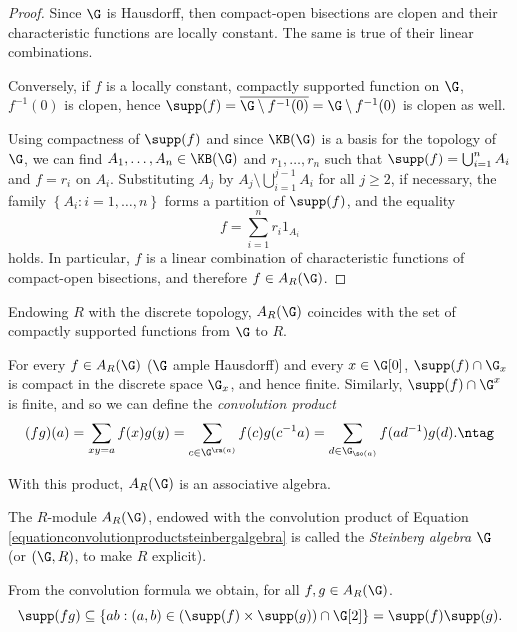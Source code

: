 \begin{proof}
Since $\G$ is Hausdorff, then compact-open bisections are clopen and their characteristic functions are locally constant. The same is true of their linear combinations.

Conversely, if $f$ is a locally constant, compactly supported function on $\G$, $f^{-1}(0)$ is clopen, hence $\supp(f)=\overline{\G\setminus f^{-1}(0)}=\G\setminus f^{-1}(0)$ is clopen as well.

Using compactness of $\supp(f)$ and since $\KB(\G)$ is a basis for the topology of $\G$, we can find $A_1,\ldots,A_n\in\KB(\G)$ and $r_1,\ldots,r_n$ such that $\supp(f)=\bigcup_{i=1}^n A_i$ and $f=r_i$ on $A_i$. Substituting $A_j$ by $A_j\setminus\bigcup_{i=1}^{j-1}A_i$ for all $j\geq 2$, if necessary, the family $\left\{A_i:i=1,\ldots,n\right\}$ forms a partition of $\supp(f)$, and the equality
\[f=\sum_{i=1}^n r_i1_{A_i}\]
holds. In particular, $f$ is a linear combination of characteristic functions of compact-open bisections, and therefore $f\in A_R(\G)$.\qedhere
\end{proof}

\begin{remarkn}
Endowing $R$ with the discrete topology, $A_R(\G)$ coincides with the set of compactly supported functions from $\G$ to $R$.
\end{remarkn}

For every $f\in A_R(\G)$ ($\G$ ample Hausdorff) and every $x\in\G[0]$, $\supp(f)\cap\G_x$ is compact in the discrete space $\G_x$, and hence finite. Similarly, $\supp(f)\cap \G^x$ is finite, and so we can define the \emph{convolution product}
\[(fg)(a)=\sum_{xy=a}f(x)g(y)=\sum_{c\in\G^{\ra(a)}}f(c)g(c^{-1}a)=\sum_{d\in\G_{\so(a)}}f(ad^{-1})g(d).\ntag\label{equationconvolutionproductsteinbergalgebra}\]

With this product, $A_R(\G)$ is an associative algebra.

\begin{definition}[{\cite{MR2565546,MR3274831}}]
The $R$-module $A_R(\G)$, endowed with the convolution product of Equation \ref{equationconvolutionproductsteinbergalgebra} is called the \emph{Steinberg algebra} $\G$ (or $(\G,R)$, to make $R$ explicit).
\end{definition}

From the convolution formula we obtain, for all $f,g\in A_R(\G)$.
\[\supp(fg)\subseteq\left\{ab:(a,b)\in(\supp(f)\times\supp(g))\cap\G[2]\right\}=\supp(f)\supp(g).\]

